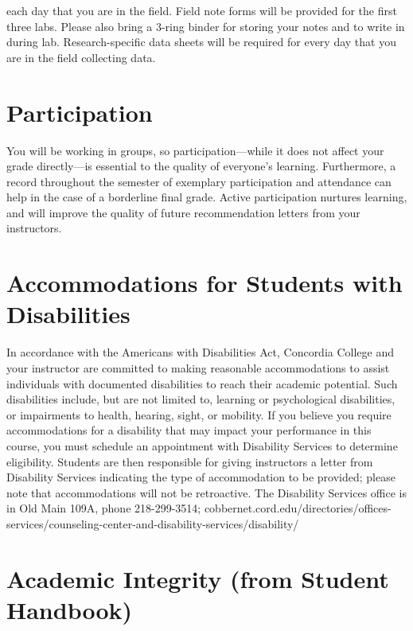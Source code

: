 \documentclass{tufte-handout}
\begin{document}
\begin{fullwidth}
 each day that you are in the field. Field note forms will be provided for the first three labs. Please also bring a 3-ring binder for storing your notes and to write in during lab. Research-specific data sheets will be required for every day that you are in the field collecting data. 

\section{Participation}

You will be working in groups, so participation---while it does not affect your grade directly---is essential to the quality of everyone's learning. Furthermore, a record throughout the semester of exemplary participation and attendance can help in the case of a borderline final grade. Active participation nurtures learning, and will improve the quality of future recommendation letters from your instructors.  

\section{Accommodations for Students with Disabilities}

In accordance with the Americans with Disabilities Act, Concordia College and your instructor are committed to making reasonable accommodations to assist individuals with documented disabilities to reach their academic potential. Such disabilities include, but are not limited to, learning or psychological disabilities, or impairments to health, hearing, sight, or mobility. If you believe you require accommodations for a disability that may impact your performance in this course, you must schedule an appointment with Disability Services to determine eligibility. Students are then responsible for giving instructors a letter from Disability Services indicating the type of accommodation to be provided; please note that accommodations will not be retroactive. The Disability Services office is in Old Main 109A, phone 218-299-3514; cobbernet.cord.edu/directories/offices-services/counseling-center-and-disability-services/disability/







\end{fullwidth}

\newpage

\section{Academic Integrity (from Student Handbook)}
\end{document}
